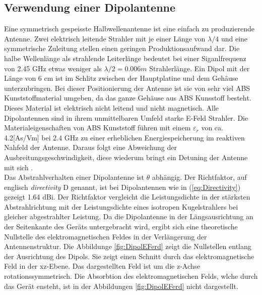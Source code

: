 \subsection{Verwendung einer Dipolantenne}
Eine symmetrisch gespeisste Halbwellenantenne  ist eine einfach zu produzierende Antenne. Zwei elektrisch leitende Strahler mit je einer Länge von $\lambda/4$ und eine symmetrische Zuleitung stellen einen geringen Produktionsaufwand dar. Die halbe Wellenlänge als strahlende Leiterlänge bedeutet bei einer Siganlfrequenz von 2.45 GHz etwas weniger als $\lambda/2=0.006m$ Strahlerlänge. Ein Dipol mit der Länge von 6 cm ist im Schlitz zwischen der Hauptplatine und dem Gehäuse unterzubringen. 
Bei dieser Positionierung der  Antenne ist sie von sehr viel ABS Kunststoffmaterial umgeben, da das ganze Gehäuse aus ABS Kunsstoff besteht. Dieses Material ist elektrisch nicht leitend und nicht magnetisch. Alle Dipolantennen sind in ihrem unmittelbaren Umfeld starke E-Feld Strahler. Die Materialeigenschaften von ABS Kunststoff führen mit einem  $\varepsilon_r$ von ca. 4.2[As/Vm] bei 2.4 GHz zu einer erheblichen Energiespeicherung im reaktiven Nahfeld der Antenne. Daraus folgt eine  Abweichung der Ausbreitungsgeschwindigkeit, diese wiederum bringt ein Detuning der Antenne mit sich \cite{WikiPermitt}.\\

Das Abstrahlverhalten einer Dipolantenne ist $\theta$ abhängig. Der Richtfaktor,  auf englisch \textit{directivity} D genannt, ist bei Dipolantennen wie in  (\ref{eq:Directivity}) gezeigt   1.64 dBi.  Der Richtfaktor vergleicht die Leistungsdichte in der stärksten Abstrahlrichtung mit der Leistungsdichte eines isotropen Kugelstrahlers  bei gleicher abgestrahlter Leistung. Da die Dipolantenne in der Längsausrichtung an der Seitenkante des Geräts untergebracht wird, ergibt sich eine theoretische Nullstelle des elektromagnetischen Feldes in der Verlängerung der Antennenstruktur. Die  Abbildunge \ref{fig:DipolEFerd} zeigt die Nullstellen entlang der Ausrichtung des Dipols. Sie zeigt einen Schnitt durch das elektromagnetische Feld in der xz-Ebene. Das dargestellten Feld ist um die z-Achse rotationssymmetrisch. Die Absorbtion des elektromagnetischen Felds, wlche durch das Gerät ensteht, ist in der Abbildungen \ref{fig:DipolEFerd} nicht dargestellt.

